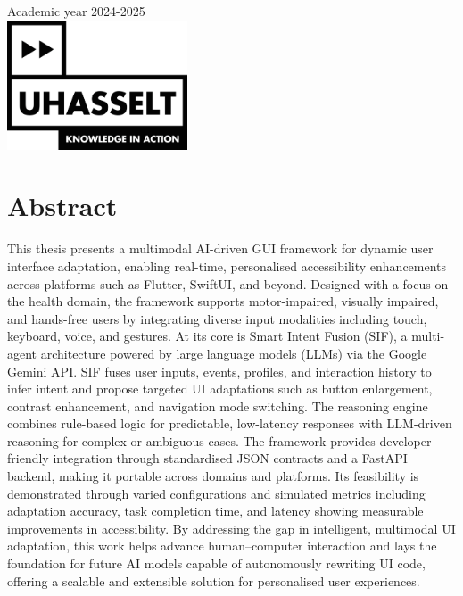 \documentclass[openany]{book}
\begin{document}
\begin{titlepage}
\vspace*{1cm}


{\large Academic year 2024-2025}\\[2cm]


\includegraphics[width=0.4\textwidth]{Images/uhasselt.jpg}\\
 

\vfill %

\end{titlepage}


\chapter*{Abstract}
This thesis presents a multimodal AI-driven GUI framework for dynamic user interface adaptation, enabling real-time, personalised accessibility enhancements across platforms such as Flutter, SwiftUI, and beyond. Designed with a focus on the health domain, the framework supports motor-impaired, visually impaired, and hands-free users by integrating diverse input modalities including touch, keyboard, voice, and gestures.
At its core is Smart Intent Fusion (SIF), a multi-agent architecture powered by large language models (LLMs) via the Google Gemini API. SIF fuses user inputs, events, profiles, and interaction history to infer intent and propose targeted UI adaptations such as button enlargement, contrast enhancement, and navigation mode switching. The reasoning engine combines rule-based logic for predictable, low-latency responses with LLM-driven reasoning for complex or ambiguous cases.
The framework provides developer-friendly integration through standardised JSON contracts and a FastAPI backend, making it portable across domains and platforms. Its feasibility is demonstrated through varied configurations and simulated metrics including adaptation accuracy, task completion time, and latency showing measurable improvements in accessibility. By addressing the gap in intelligent, multimodal UI adaptation, this work helps advance human–computer interaction and lays the foundation for future AI models capable of autonomously rewriting UI code, offering a scalable and extensible solution for personalised user experiences.
\end{document}
